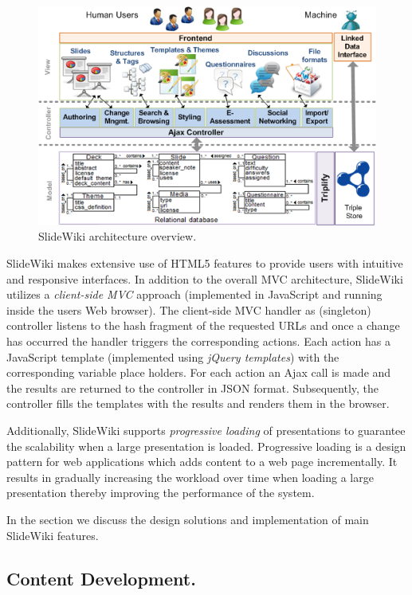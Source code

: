 \documentclass[ngerman,UKenglish,table]{scrbook}
\begin{document}
\begin{figure}[tb]
\centering
	\includegraphics[width=1\columnwidth]{images/architecture.png}
	\caption{SlideWiki architecture overview.}
	\label{fig:slidewiki_architecture}
\end{figure}

SlideWiki makes extensive use of HTML5 features to provide users with intuitive and responsive interfaces.
In addition to the overall MVC architecture, SlideWiki utilizes a \emph{client-side MVC} approach (implemented in JavaScript and running inside the users Web browser).
The client-side MVC handler as (singleton) controller listens to the hash fragment of the requested URLs and once a change has occurred the handler triggers the corresponding actions.
Each action has a JavaScript template (implemented using \textit{jQuery templates}) with the corresponding variable place holders.
For each action an Ajax call is made and the results are returned to the controller in JSON format.
Subsequently, the controller fills the templates with the results and renders them in the browser.

Additionally, SlideWiki supports \emph{progressive loading} of presentations to guarantee the scalability when a large presentation is loaded.
Progressive loading is a design pattern for web applications which adds content to a web page incrementally. 
It results in gradually increasing the workload over time when loading a large presentation thereby improving the performance of the system.

In the section we discuss the design solutions and implementation of main SlideWiki features. 

\subsection{Content Development.}
\label{sec:content_development_implementation}
\end{document}
